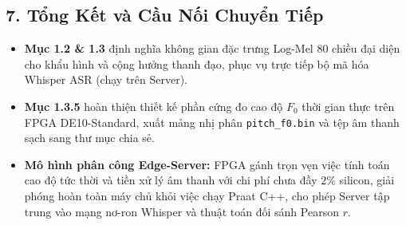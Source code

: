 \documentclass[11pt,a4paper]{article}
\begin{document}
\begin{table}[H]
\centering
\small
{}
\caption{Sổ cái hạch toán tài nguyên silicon cho khối Pitch trên FPGA DE10-Standard.}
\label{tab:silicon_pitch}
\end{table}

\subsection*{7. Tổng Kết và Cầu Nối Chuyển Tiếp}

\begin{itemize}
    \setlength{\itemsep}{0.5pt}
    \item \textbf{Mục 1.2 \& 1.3} định nghĩa không gian đặc trưng Log-Mel 80 chiều đại diện cho khẩu hình và cộng hưởng thanh đạo, phục vụ trực tiếp bộ mã hóa Whisper ASR (chạy trên Server).
    \item \textbf{Mục 1.3.5} hoàn thiện thiết kế phần cứng đo cao độ $F_0$ thời gian thực trên FPGA DE10-Standard, xuất mảng nhị phân \texttt{pitch\_f0.bin} và tệp âm thanh sạch sang thư mục chia sẻ.
    \item \textbf{Mô hình phân công Edge-Server:} FPGA gánh trọn vẹn việc tính toán cao độ tức thời và tiền xử lý âm thanh với chi phí chưa đầy $2\%$ silicon, giải phóng hoàn toàn máy chủ khỏi việc chạy Praat C++, cho phép Server tập trung vào mạng nơ-ron Whisper và thuật toán đối sánh Pearson $r$.
\end{itemize}
\end{document}
